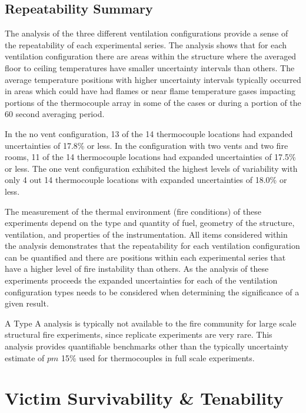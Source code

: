 \documentclass[12pt,oneside]{book}
\begin{document}
\subsection{Repeatability Summary}

The analysis of the three different ventilation configurations provide a sense of the repeatability of each experimental series.  The analysis shows that for each ventilation configuration there are areas within the structure where the averaged floor to ceiling temperatures have smaller uncertainty intervals than others.  The average temperature positions with higher uncertainty intervals typically occurred in areas which could have had flames or near flame temperature gases impacting portions of the thermocouple array in some of the cases or during a portion of the 60 second averaging period. 

In the no vent configuration, 13 of the 14 thermocouple locations had expanded uncertainties of 17.8\% or less.  In the configuration with two vents and two fire rooms, 11 of the 14 thermocouple locations had expanded uncertainties of 17.5\% or less.  The one vent configuration exhibited the highest levels of variability with only 4 out 14 thermocouple locations with expanded uncertainties of 18.0\% or less.

The measurement of the thermal environment (fire conditions) of these experiments depend on the type and quantity of fuel, geometry of the structure, ventilation, and properties of the instrumentation.  All items considered within the analysis demonstrates that the repeatability for each ventilation configuration can be quantified and there are positions within each experimental series that have a higher level of fire instability than others.  As the analysis of these experiments proceeds the expanded uncertainties for each of the ventilation configuration types needs to be considered when determining the significance of a given result.  

A Type A analysis is typically not available to the fire community for large scale structural fire experiments, since replicate experiments are very rare. This analysis provides quantifiable benchmarks other than the typically uncertainty estimate of $pm$ 15\% used for thermocouples in full scale experiments.       


\section{Victim Survivability \& Tenability}
\end{document}
